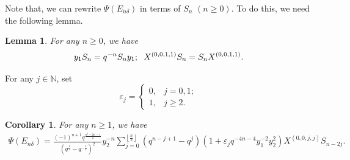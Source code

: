 \documentclass[reqno,11pt]{amsart}
\numberwithin{equation}{section}
\newtheorem{corollary}[theorem]{Corollary}
\newtheorem{lemma}[theorem]{Lemma}
\begin{document}
Note that, we can rewrite $\Psi \left( {{E_{n\delta }}} \right)$ in terms of $S_n$ $(n\geq 0)$. To do this, we need the following lemma.
\begin{lemma}\cite{DXC23}\label{5.4}
	For any $n \ge 0$, we have
\begin{eqnarray*}
		{y_1}{S_n} = {q^{ - n}}{S_n}{y_1};\hspace{0.2cm}
		{X^{(0,0,1,1)}}{S_n} = {S_n}{X^{(0,0,1,1)}}.
\end{eqnarray*}
\end{lemma}

	For any $j\in \mathbb{N}$, set
\[\varepsilon_j=
\begin{cases}
	0, & j=0,1;\\
	1, & j\ge 2.
\end{cases}\]
\begin{corollary}\label{5.5}
	For any $n\ge 1$, we have
	\begin{eqnarray*}
	\Psi \left( {{E_{n\delta }}} \right) = \frac{{{{( - 1)}^{n + 1}}{q^{\frac{{{n^2} - 2n - 1}}{2}}}}}{{{{\left( {{q^{\frac{1}{2}}} - {q^{ - \frac{1}{2}}}} \right)}^2}}}y_2^{ - n}\sum\limits_{j = 0}^{\left\lfloor {\frac{n}{2}} \right\rfloor } {\left( {{q^{n - j + 1}} - {q^j}} \right)\left( {1 + {\varepsilon _j}{q^{ - 4n - 4}}y_1^{ - 2}y_2^2} \right){X^{(0,0,j,j)}}{S_{n - 2j}}} .
	\end{eqnarray*}
\end{corollary}
\end{document}
